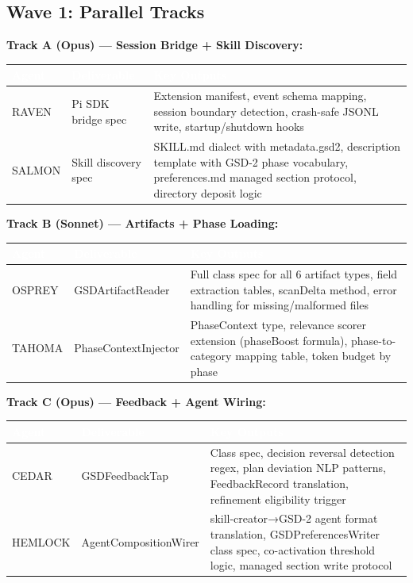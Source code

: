 \documentclass[11pt,letterpaper]{article}
\newcommand{\tableheader}[1]{\textbf{\sffamily\textcolor{white}{#1}}}
\begin{document}
\subsection{Wave 1: Parallel Tracks}

\textbf{Track A (Opus) --- Session Bridge + Skill Discovery:}

\begin{center}
\begin{tabularx}{\textwidth}{L{2.5cm}L{2.5cm}X}
\toprule
{}
\tableheader{Agent} & \tableheader{Deliverable} & \tableheader{Key Outputs} \\
\midrule
RAVEN & Pi SDK bridge spec & Extension manifest, event schema mapping, session boundary detection, crash-safe JSONL write, startup/shutdown hooks \\
SALMON & Skill discovery spec & SKILL.md dialect with metadata.gsd2, description template with GSD-2 phase vocabulary, preferences.md managed section protocol, directory deposit logic \\
\bottomrule
\end{tabularx}
\end{center}

\textbf{Track B (Sonnet) --- Artifacts + Phase Loading:}

\begin{center}
\begin{tabularx}{\textwidth}{L{2.5cm}L{2.5cm}X}
\toprule
{}
\tableheader{Agent} & \tableheader{Deliverable} & \tableheader{Key Outputs} \\
\midrule
OSPREY & GSDArtifactReader & Full class spec for all 6 artifact types, field extraction tables, scanDelta method, error handling for missing/malformed files \\
TAHOMA & PhaseContextInjector & PhaseContext type, relevance scorer extension (phaseBoost formula), phase-to-category mapping table, token budget by phase \\
\bottomrule
\end{tabularx}
\end{center}

\textbf{Track C (Opus) --- Feedback + Agent Wiring:}

\begin{center}
\begin{tabularx}{\textwidth}{L{2.5cm}L{2.5cm}X}
\toprule
{}
\tableheader{Agent} & \tableheader{Deliverable} & \tableheader{Key Outputs} \\
\midrule
CEDAR & GSDFeedbackTap & Class spec, decision reversal detection regex, plan deviation NLP patterns, FeedbackRecord translation, refinement eligibility trigger \\
HEMLOCK & AgentCompositionWirer & skill-creator→GSD-2 agent format translation, GSDPreferencesWriter class spec, co-activation threshold logic, managed section write protocol \\
\bottomrule
\end{tabularx}
\end{center}
\end{document}
